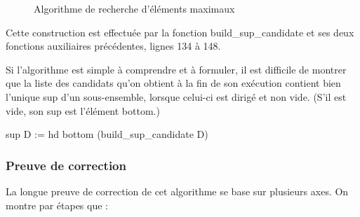 \documentclass{article}
\newcommand\code[1]{{\fontfamily{lmtt}\selectfont #1}}
\theoremstyle{definition}
\begin{document}
\begin{figure}[ht]
{
	}
\caption{Algorithme de recherche d'éléments maximaux}
\end{figure}


Cette construction est effectuée par la fonction \code{build\_sup\_candidate} et ses deux fonctions auxiliaires précédentes, lignes 134 à 148.

Si l'algorithme est simple à comprendre et à formuler, il est difficile de montrer que la liste des candidats qu'on obtient à la fin de son exécution contient bien l'unique sup d'un sous-ensemble, lorsque celui-ci est dirigé et non vide. (S'il est vide, son sup est l'élément bottom.)

\begin{coq}
sup D := hd bottom (build_sup_candidate D)
\end{coq}


\subsubsection{Preuve de correction}

La longue preuve de correction de cet algorithme se base sur plusieurs axes. On montre par étapes que :
\end{document}
